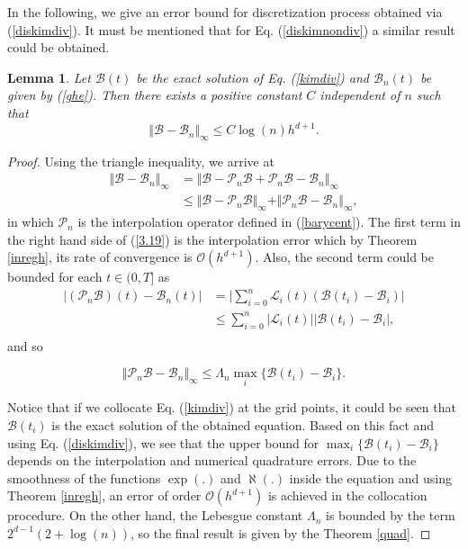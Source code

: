 \documentclass[fleqn,final,3p,11pt]{elsarticle}
\newtheorem{lemma}[theorem]{Lemma}
\theoremstyle{definition}
\theoremstyle{remark}
\numberwithin{equation}{section}
\begin{document}
In the following, we give an error bound for discretization process obtained via (\ref{diskimdiv}). It must be mentioned that for Eq. (\ref{diskimnondiv}) a similar result could be obtained.
\begin{lemma}\label{bn}
Let $\mathcal{B}(t)$ be the exact solution of Eq. (\ref{kimdiv}) and $\mathcal{B}_{n}(t)$ be given by (\ref{ghe}). Then there exists a positive constant $C$ independent of $n$ such that
\begin{equation*}
\Vert \mathcal{B} - \mathcal{B}_{n} \Vert_{\infty} \leq C\log(n)h^{d+1}.
\end{equation*}
\end{lemma}
\begin{proof}
Using the triangle inequality, we arrive at
\begin{equation}\label{3.19}
\begin{split}
\Vert \mathcal{B} - \mathcal{B}_{n} \Vert_{\infty} & =\Vert \mathcal{B} - \mathcal{P}_{n} \mathcal{B}+ \mathcal{P}_{n} \mathcal{B} - \mathcal{B}_{n} \Vert_{\infty} \\
 &  \leq \Vert \mathcal{B} - \mathcal{P}_{n} \mathcal{B} \Vert_{\infty} + \Vert  \mathcal{P}_{n} \mathcal{B}-\mathcal{B}_{n} \Vert_{\infty},
  \end{split}
\end{equation}
in which $\mathcal{P}_{n}$ is the interpolation operator defined in (\ref{barycent}). The first term in the right hand side of (\ref{3.19}) is the interpolation error which by Theorem \ref{inregh}, its rate of convergence is $\mathcal{O}(h^{d+1})$. Also, the second term could be bounded for each $t \in (0,T]$ as
\begin{equation}
\begin{split}
\vert  (\mathcal{P}_{n}\mathcal{B})(t) - \mathcal{B}_{n}(t)\vert &= \Big \vert \sum_{i=0}^{n} \mathcal{L}_{i}(t) (\mathcal{B}(t_{i}) -\mathcal{B}_{i}) \Big \vert \\
 & \leq \sum_{i=0}^{n} \vert \mathcal{L}_{i}(t) \vert \vert \mathcal{B}(t_{i}) - \mathcal{B}_{i}\vert,\\
\end{split}
\end{equation}
and so
 \begin{center}
 \begin{equation}\label{uppad}
  \Vert  \mathcal{P}_{n} \mathcal{B}-\mathcal{B}_{n} \Vert_{\infty}  \leq  \Lambda_{n} \max_{i} \{\mathcal{B}(t_{i}) - \mathcal{B}_{i}\}.\end{equation}
 \end{center}
Notice that if we collocate Eq. (\ref{kimdiv}) at the grid points, it could be seen that  $\mathcal{B}(t_{i})$ is the exact solution of the obtained equation. Based on this fact and using  Eq. (\ref{diskimdiv}), we see  that the upper bound for $ \max_{i} \{\mathcal{B}(t_{i}) - \mathcal{B}_{i}\}$ depends on the interpolation and numerical quadrature errors. Due to the smoothness of the functions $\exp(.)$ and $\aleph(.)$ inside the equation and using Theorem \ref{inregh}, an error of order  $\mathcal{O}(h^{d+1})$ is achieved in the collocation procedure. On the other hand,  the Lebesgue constant $\Lambda_{n}$ is bounded by the term  $2^{d-1}(2+\log(n))$, so the final result is given by the  Theorem \ref{quad}.
\end{proof}
\end{document}
